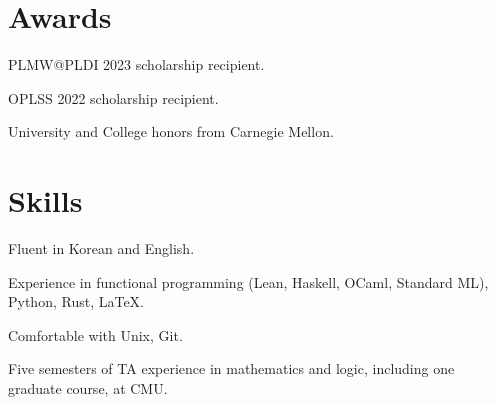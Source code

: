 \documentclass[12pt]{article}
\begin{document}
\section{Awards}

PLMW@PLDI 2023 scholarship recipient.

OPLSS 2022 scholarship recipient.

University and College honors from Carnegie Mellon.

\section{Skills}

Fluent in Korean and English.

Experience in functional programming (Lean, Haskell, OCaml, Standard ML), Python, Rust, LaTeX.

Comfortable with Unix, Git.

Five semesters of TA experience in mathematics and logic, including one graduate course, at CMU.
\end{document}
